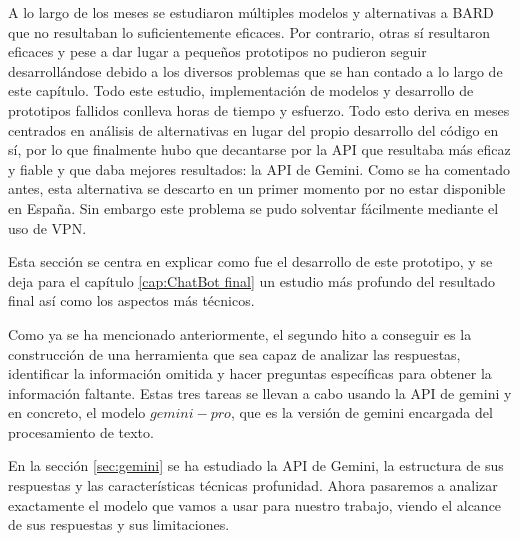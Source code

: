 A lo largo de los meses se estudiaron múltiples modelos y alternativas a BARD que no resultaban lo suficientemente eficaces. Por contrario, otras sí resultaron eficaces y pese a dar lugar a pequeños prototipos no pudieron seguir desarrollándose debido a los diversos problemas que se han contado a lo largo de este capítulo. Todo este estudio, implementación de modelos y desarrollo de prototipos fallidos conlleva horas de tiempo y esfuerzo. Todo esto deriva en meses centrados en análisis de alternativas en lugar del propio desarrollo del código en sí, por lo que finalmente hubo que decantarse por la API que resultaba más eficaz y fiable y que daba mejores resultados: la API de Gemini. Como se ha comentado antes, esta alternativa se descarto en un primer momento por no estar disponible en España. Sin embargo este problema se pudo solventar fácilmente mediante el uso de VPN. 

Esta sección se centra en explicar como fue el desarrollo de este prototipo, y se deja para el capítulo \ref{cap:ChatBot final} un estudio más profundo del resultado final así como los aspectos más técnicos.

Como ya se ha mencionado anteriormente, el segundo hito a conseguir es la construcción de una herramienta que sea capaz de analizar las respuestas, identificar la información omitida y hacer preguntas específicas para obtener la información faltante. Estas tres tareas se llevan a cabo usando la API de gemini y en concreto, el modelo $gemini-pro$, que es la versión de gemini encargada del procesamiento de texto. 

En la sección \ref{sec:gemini} se ha estudiado la API de Gemini, la estructura de sus respuestas y las características técnicas profunidad. Ahora pasaremos a analizar exactamente el modelo que vamos a usar para nuestro trabajo, viendo el alcance de sus respuestas y sus limitaciones. 

